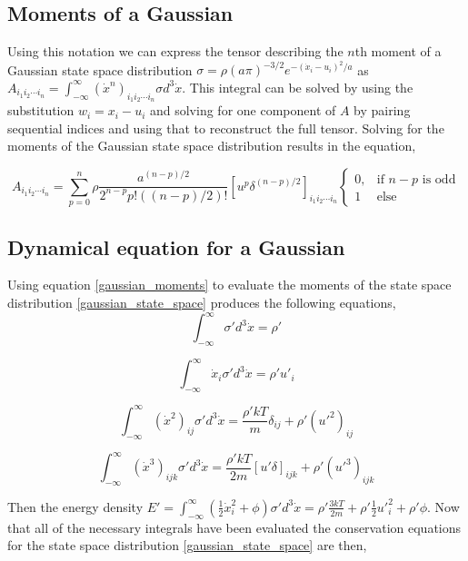 \documentclass[%
 twocolumn,
 amsmath,amssymb,
 aps,
]{revtex4-1}
\newcommand{\intVdot}[1]{\int_{-\infty}^{\infty} #1 d^3\dot{x}}
\begin{document}
\subsection{Moments of a Gaussian}
Using this notation we can express the tensor describing the $n$th moment of a Gaussian state space distribution $\sigma=\rho\left(a \pi\right)^{-3/2}e^{-\left(\dot{x}_i-u_i\right)^2/a}$ as $A_{i_1i_2\cdots i_n}=\intVdot{\left(\dot{x}^n\right)_{i_1i_2\cdots i_n}\sigma}$. This integral can be solved by using the substitution $w_i=x_i - u_i$ and solving for one component of $A$ by pairing sequential indices and using that to reconstruct the full tensor. Solving for the moments of the Gaussian state space distribution results in the equation,

\begin{widetext}
\begin{equation}
A_{i_1i_2\cdots i_n}=\sum_{p=0}^n\rho\frac{a^{\left(n-p\right)/2}}{2^{n-p}p!\left(\left(n-p\right)/2\right)!}\left[u^p\delta^{\left(n-p\right)/2}\right]_{i_1i_2\cdots i_n}
\begin{cases}
0, & \text{if $n-p$ is odd}\\
1 &  \text{else}
\end{cases}
\label{gaussian_moments}
\end{equation}
\end{widetext}

\subsection{Dynamical equation for a Gaussian}
Using equation \eqref{gaussian_moments} to evaluate the moments of the state space distribution \eqref{gaussian_state_space} produces the following equations,
\[
\intVdot{\sigma'}=\rho'
\]

\[
\intVdot{\dot{x}_i\sigma'}=\rho' u'_i
\]

\[
\intVdot{\left(\dot{x}^2\right)_{ij}\sigma'}=\frac{\rho'kT}{m}\delta_{ij} + \rho'\left(u'^2\right)_{ij}
\]

\[
\intVdot{\left(\dot{x}^3\right)_{ijk}\sigma'}=\frac{\rho'kT}{2m}\left[u'\delta\right]_{ijk} + \rho'\left(u'^3\right)_{ijk}
\]

Then the energy density $E'=\intVdot{\left(\frac{1}{2}\dot{x}_i^2 + \phi\right)\sigma'}=\rho'\frac{3kT}{2m}+\rho'\frac{1}{2}{u'}_i^2+\rho'\phi$. Now that all of the necessary integrals have been evaluated the conservation equations for the state space distribution \eqref{gaussian_state_space} are then,
\end{document}
